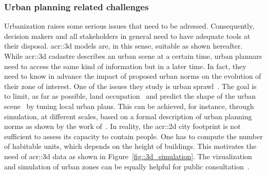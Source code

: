         \subsubsection{Urban planning related challenges}
            Urbanization raises some serious issues that need to be adressed.
            Consequently, decision makers and all stakeholders in general need to have adequate tools at their disposal.
            \gls{acr::3d} models are, in this sense, suitable as shown hereafter.\\
            While \gls{acr::3d} cadastre describes an urban scene at a certain time, urban plannars need to access the same kind of information but in a later time.
            In fact, they need to know in advance the impact of proposed urban norms on the evolution of their zone of interest. 
            One of the issues they study is urban sprawl~\parencite{ludlow2006urban}.
            The goal is to limit, as far as possible, land occupation~\parencite{tannier2012assessing} and predict the shape of the urban scene~\parencite{brasebin20183d} by tuning local urban plans.
            This can be achieved, for instance, through simulation, at different scales, based on a formal description of urban planning norms as shown by the work of~\textcite{colomb2017simulation}.
            In reality, the \gls{acr::2d} city footprint is not sufficient to assess its capacity to contain people.
            One has to compute the number of habitable units, which depends on the height of buildings.
            This motivates the need of \gls{acr::3d} data as shown in Figure~\ref{fig::3d_simulation}.
            The  vizualization and simulation of urban zones can be equally helpful for public consultation~\parencite{wu2010virtual}.\\

